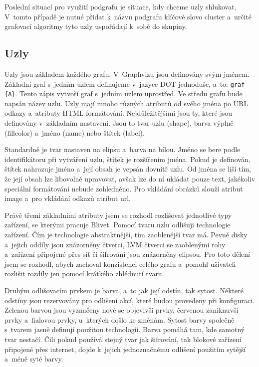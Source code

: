 \documentclass[printed,color,table,oneside,nolot,nolof]{fithesis}
\begin{document}
	Poslední situací pro využití podgrafu je situace, kdy chceme uzly shlukovat. V~tomto případě je nutné přidat k~názvu podgrafu klíčové slovo cluster a~určité grafovací algoritmy tyto uzly 
	uspořádají k~sobě do skupiny.

\subsection{Uzly}
	Uzly jsou základem každého grafu. V~Graphvizu jsou definovány svým jménem. Základní graf s~jedním uzlem definujeme v~jazyce DOT jednoduše, a~to: \texttt{graf \{A\}}. Tento zápis vytvoří
	graf s~jedním uzlem uprostřed. Ve středu grafu bude napsán název uzlu. Uzly mají mnoho různých atributů od svého jména po URL odkazy a~atributy HTML formátování. 
	Nejdůležitějšími jsou ty, které jsou definovány v~základním nastavení. Jsou to tvar uzlu (shape), barva výplně (fillcolor) a~jméno (name) nebo štítek (label). 
	
	Standardně je tvar nastaven na elipsu a~barva
	na bílou. Jméno se bere podle identifikátoru při vytváření uzlu, štítek je rozšířením jména. Pokud je definován, štítek nahrazuje jméno a~její obsah je vepsán dovnitř uzlu. Od jména se liší 
	tím, že její obsah lze libovolně upravovat, avšak lze do ní ukládat pouze text, jakékoliv speciální formátování nebude zohledněno. Pro vkládání obrázků slouží atribut image a~pro vkládání
	odkazů atribut url.

	Právě třemi základními atributy jsem se rozhodl rozlišovat jednotlivé typy zařízení, se kterými pracuje Blivet. Pomocí tvaru uzlu odlišuji technologie zařízení. Čím je technologie
	abstraktnější, tím zaoblenější tvar má. Pevné disky a~jejich oddíly jsou znázorněny čtverci, LVM čtverci se zaoblenými rohy a~zařízení připojené přes síť či šifrování jsou znázorněny elipsou.
	Pro toto dělení jsem se rozhodl, abych zachoval konzistenci celého grafu a~pomohl uživateli rozlišit rozdíly jen pomocí krátkého zhlédnutí tvaru.

	Druhým odlišovacím prvkem je barva, a~to jak její odstín, tak sytost. Některé odstíny jsou rezervovány pro odlišení akcí, které budou provedeny při konfiguraci. Zelenou barvou jsou vyznačeny
	nově se objevivší prvky, červenou zaniknuvší prvky a~fialovou prvky, u~kterých došlo ke změnám. Sytost barvy společně s~tvarem jasně definují použitou technologii. Barva pomáhá tam, kde
	samotný tvar nestačí. Čili pokud používá stejný tvar jak šifrování, tak blokové zařízení připojené přes internet, dojde k~jejich jednoznačnému odlišení použitím sytější a~méně syté barvy.
\end{document}
